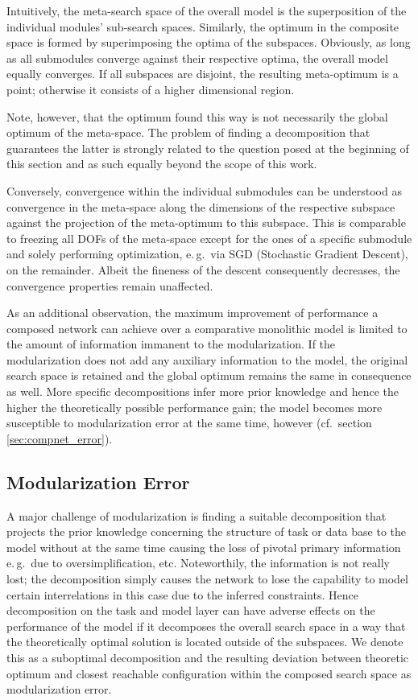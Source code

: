 \documentclass[conference]{IEEEtran}
\begin{document}
Intuitively, the meta-search space of the overall model is the superposition of the individual modules' sub-search spaces. Similarly, the optimum in the composite space is formed by superimposing the optima of the subspaces. Obviously, as long as all submodules converge against their respective optima, the overall model equally converges. If all subspaces are disjoint, the resulting meta-optimum is a point; otherwise it consists of a higher dimensional region.

Note, however, that the optimum found this way is not necessarily the global optimum of the meta-space. The problem of finding a decomposition that guarantees the latter is strongly related to the question posed at the beginning of this section and as such equally beyond the scope of this work.

Conversely, convergence within the individual submodules can be understood as convergence in the meta-space along the dimensions of the respective subspace against the projection of the meta-optimum to this subspace. This is comparable to freezing all DOFs of the meta-space except for the ones of a specific submodule and solely performing optimization, e.\,g.\ via SGD (Stochastic Gradient Descent), on the remainder. Albeit the fineness of the descent consequently decreases, the convergence properties remain unaffected.

As an additional observation, the maximum improvement of performance a composed network can achieve over a comparative monolithic model is limited to the amount of information immanent to the modularization. If the modularization does not add any auxiliary information to the model, the original search space is retained and the global optimum remains the same in consequence as well. More specific decompositions infer more prior knowledge and hence the higher the theoretically possible performance gain; the model becomes more susceptible to modularization error at the same time, however (cf.\ section \ref{sec:compnet_error}).
            
\subsection{Modularization Error%
            \label{sec:compnet_error}}

A major challenge of modularization is finding a suitable decomposition that projects the prior knowledge concerning the structure of task or data base to the model without at the same time causing the loss of pivotal primary information e.\,g.\ due to oversimplification, etc. Noteworthily, the information is not really lost; the decomposition simply causes the network to lose the capability to model certain interrelations in this case due to the inferred constraints. Hence decomposition on the task and model layer can have adverse effects on the performance of the model if it decomposes the overall search space in a way that the theoretically optimal solution is located outside of the subspaces. We denote this as a suboptimal decomposition and the resulting deviation between theoretic optimum and closest reachable configuration within the composed search space as modularization error.
\end{document}
